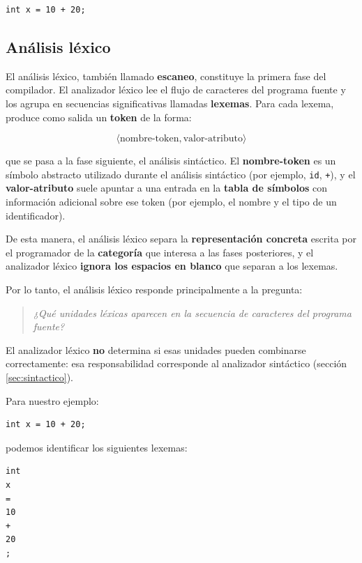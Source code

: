 \documentclass[11pt,a4paper]{article}
\begin{document}
\begin{lstlisting}
int x = 10 + 20;
\end{lstlisting}

\subsection{Análisis léxico}
\label{sec:lexico}

El análisis léxico, también llamado \textbf{escaneo}, constituye la primera fase del
compilador. El analizador léxico lee el flujo de caracteres del programa fuente y los agrupa en
secuencias significativas llamadas \textbf{lexemas}. Para cada lexema, produce como salida un
\textbf{token} de la forma:

\[
\langle \text{nombre-token}, \text{valor-atributo} \rangle
\]

que se pasa a la fase siguiente, el análisis sintáctico. El \textbf{nombre-token} es un símbolo
abstracto utilizado durante el análisis sintáctico (por ejemplo, \texttt{id}, \texttt{+}), y el
\textbf{valor-atributo} suele apuntar a una entrada en la \textbf{tabla de símbolos} con
información adicional sobre ese token (por ejemplo, el nombre y el tipo de un identificador).

De esta manera, el análisis léxico separa la \textbf{representación concreta} escrita por el
programador de la \textbf{categoría} que interesa a las fases posteriores, y el analizador
léxico \textbf{ignora los espacios en blanco} que separan a los lexemas.

Por lo tanto, el análisis léxico responde principalmente a la pregunta:

\begin{quote}
\textit{¿Qué unidades léxicas aparecen en la secuencia de caracteres del programa fuente?}
\end{quote}

El analizador léxico \textbf{no} determina si esas unidades pueden combinarse correctamente:
esa responsabilidad corresponde al analizador sintáctico (sección \ref{sec:sintactico}).

Para nuestro ejemplo:

\begin{lstlisting}
int x = 10 + 20;
\end{lstlisting}

podemos identificar los siguientes lexemas:

\begin{lstlisting}
int
x
=
10
+
20
;
\end{lstlisting}
\end{document}
